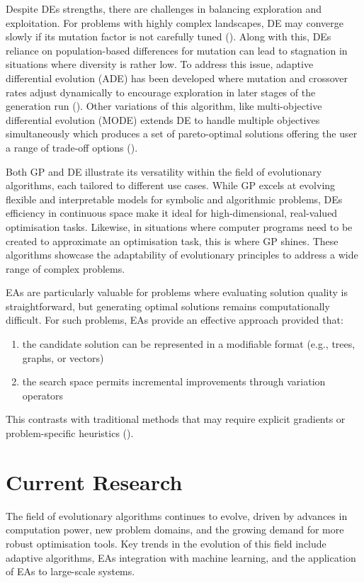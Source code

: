 \noindent Despite DEs strengths, there are challenges in balancing exploration and exploitation. For problems with highly complex landscapes, DE may converge slowly if its mutation factor is not carefully tuned (\cite{das2010differential}). Along with this, DEs reliance on population-based differences for mutation can lead to stagnation in situations where diversity is rather low. To address this issue, adaptive differential evolution (ADE) has been developed where mutation and crossover rates adjust dynamically to encourage exploration in later stages of the generation run (\cite{das2010differential}). Other variations of this algorithm, like multi-objective differential evolution (MODE) extends DE to handle multiple objectives simultaneously which produces a set of pareto-optimal solutions offering the user a range of trade-off options (\cite{xue2003pareto}). \bigskip

\noindent Both GP and DE illustrate its versatility within the field of evolutionary algorithms, each tailored to different use cases. While GP excels at evolving flexible and interpretable models for symbolic and algorithmic problems, DEs efficiency in continuous space make it ideal for high-dimensional, real-valued optimisation tasks. Likewise, in situations where computer programs need to be created to approximate an optimisation task, this is where GP shines. These algorithms showcase the adaptability of evolutionary principles to address a wide range of complex problems. \bigskip

\noindent EAs are particularly valuable for problems where evaluating solution quality is straightforward, but generating optimal solutions remains computationally difficult. For such problems, EAs provide an effective approach provided that:
\begin{enumerate}
	\item the candidate solution can be represented in a modifiable format (e.g., trees, graphs, or vectors)
	\item the search space permits incremental improvements through variation operators
\end{enumerate}

\noindent This contrasts with traditional methods that may require explicit gradients or problem-specific heuristics (\cite{intelligentOptimization}).


\section{Current Research}\label{sec:ea_current_research}
The field of evolutionary algorithms continues to evolve, driven by advances in computation power, new problem domains, and the growing demand for more robust optimisation tools. Key trends in the evolution of this field include adaptive algorithms, EAs integration with machine learning, and the application of EAs to large-scale systems. \bigskip

